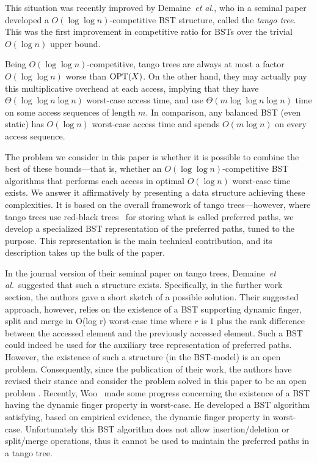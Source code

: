 \documentclass[letterpaper,11pt]{article}
\begin{document}
This situation was recently improved by Demaine~\emph{et al.}, who in a
seminal paper~\cite{tango} developed a $O(\log \log n)$-competitive BST
structure, called the \emph{tango tree}. This was the first improvement
in competitive ratio for BSTs over the trivial $O(\log n)$ upper
bound.


Being $O(\log \log n)$-competitive, tango trees are always at most a factor
$O(\log \log n)$ worse than ${\rm OPT}(X)$.
On the other hand, they may actually pay this multiplicative overhead at
each access, implying that they have $\Theta(\log \log n \log n)$
worst-case access time, and use $\Theta(m \log \log n \log n)$ time on some
access sequences of length $m$. In comparison, any balanced BST (even
static) has $O(\log n)$ worst-case access time and spends $O(m \log n)$ on
every access sequence.

The problem we consider in this paper is whether it is possible to combine the
best of these bounds---that is, whether an $O(\log \log n)$-competitive BST
algorithms that performs each access in optimal $O(\log n)$ worst-case time
exists. We answer it affirmatively by presenting a data structure achieving
these complexities. It is based on the overall framework of tango
trees---however, where tango trees use red-black trees~\cite{redblack} for
storing what is
called preferred paths, we develop a specialized BST representation of the
preferred paths, tuned to the purpose. This representation is the main
technical contribution, and its description takes up the bulk of the paper.  

In the journal version of their seminal paper on tango trees,
Demaine~\emph{et al.}\ suggested that such a structure
exists. Specifically, in the further work section, the authors gave a short
sketch of a possible solution. Their suggested approach, however, relies on
the existence of a BST supporting dynamic finger, split and merge in O(log
r) worst-case time where $r$ is $1$ plus the rank difference between the
accessed element and the previously accessed element. Such a BST could
indeed be used for the auxiliary tree representation of preferred paths.
However, the existence of such a structure (in the BST-model) is an open
problem.  Consequently, since the publication of their work, the authors
have revised their stance and consider the problem solved in this paper to
be an open problem \cite{john}.  Recently, Woo~\cite{woo} made some
progress concerning the existence of a BST having the dynamic finger
property in worst-case. He developed a BST algorithm satisfying, based on
empirical evidence, the dynamic finger property in worst-case.
Unfortunately this BST algorithm does not allow insertion/deletion or
split/merge operations, thus it cannot be used to maintain the preferred
paths in a tango tree.
\end{document}
